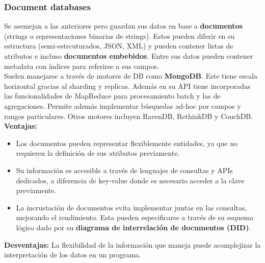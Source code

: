 \subsubsection*{Document databases}
Se asemejan a las anteriores pero guardan sus datos en base a \textbf{documentos} (strings o representaciones binarias de strings). Estos pueden diferir en su estructura (semi-estrcuturados, JSON, XML) y pueden contener listas de atributos e incluso \textbf{documentos embebidos}. Entre sus datos pueden contener metadata con índices para referirse a sus campos. \\
Suelen manejarse a través de motores de DB como \textbf{MongoDB}. Este tiene escala horizontal gracias al sharding y replicas. Además en su API tiene incorporadas las funcionalidades de MapReduce para procesamiento batch y las de agregaciones. Permite además implementar búsquedas ad-hoc por campos y rangos particulares. Otros motores incluyen RavenDB, RethinkDB y CouchDB. \\
\textbf{Ventajas:}
\begin{itemize}
    \item Los documentos pueden representar flexiblemente entidades, ya que no requieren la definición de sus atributos previamente.
    \item Su información es accesible a través de lenguajes de consultas y APIs dedicados, a diferencia de key-value donde es necesario acceder a la clave previamente.
    \item La incrustación de documentos evita implementar juntas en las consultas, mejorando el rendimiento. Esta pueden especificarse a través de su esquema lógico dado por su \textbf{diagrama de interrelación de documentos (DID)}.
\end{itemize}
\textbf{Desventajas:} La flexibilidad de la información que maneja puede acomplejizar la interpretación de los datos en un programa.

